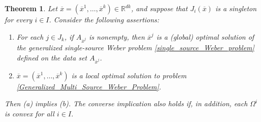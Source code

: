 \documentclass[sn-mathphys-num]{sn-jnl}%
\newtheorem{theorem}{Theorem}[section]
\theoremstyle{definition}
\begin{document}
\begin{theorem} \label{L.O.Solution_3}
	Let $\overline{x}=(\overline{x}^1,\dots,\overline{x}^k)\in \mathbb{R}^{dk}$, and suppose that $J_i(\overline{x})$ is a singleton for every $i \in I$. Consider the following assertions:
	
	\begin{enumerate}
		\item[\rm {(a)}] For each $j \in J_k$, if $A_{\overline{x}^j}$ is nonempty, then $\overline{x}^j$ is a (global) optimal solution of the generalized single-source Weber problem \eqref{single_source_Weber_problem} defined on the data set $A_{\overline{x}^j}$.
		\item[\rm{(b)}] $\overline{x}=(\overline{x}^1,\dots,\overline{x}^k)$ is a local optimal solution to problem \eqref{Generalized_Multi_Source_Weber_Problem}.
	\end{enumerate}
	
	Then (a) implies (b). The converse implication also holds if, in addition, each $\Omega^i$ is convex for all $i \in I$.
	
\end{theorem}
\end{document}
